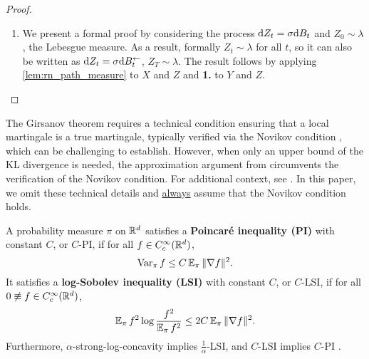 \begin{proof}
\begin{enumerate}[wide=0pt,itemsep=0pt, topsep=0pt,parsep=0pt,partopsep=0pt]
\item We present a formal proof by considering the process $\mathrm{d} Z_t=\sigma\mathrm{d} B_t$ and $Z_0\sim\lambda$, the Lebesgue measure. As a result, formally $Z_t\sim\lambda$ for all $t$, so it can also be written as $\mathrm{d} Z_t=\sigma\mathrm{d}B^\gets_t$, $Z_T\sim\lambda$. The result follows by applying \cref{lem:rn_path_measure} to $X$ and $Z$ and \textbf{1.} to $Y$ and $Z$.
\end{enumerate}
\end{proof}

\begin{remark}
    The Girsanov theorem requires a technical condition ensuring that a local martingale is a true martingale, typically verified via the Novikov condition \cite[Chap. 3, Cor. 5.13]{karatzas1991brownian}, which can be challenging to establish. However, when only an upper bound of the KL divergence is needed, the approximation argument from \citet[App. B.2]{chen2023sampling} circumvents the verification of the Novikov condition. For additional context, see \citet[Sec. 3.2]{chewi2022log}. In this paper, we omit these technical details and \underline{always} assume that the Novikov condition holds.
\end{remark}

\begin{definition}
    A probability measure $\pi$ on $\mathbb{R}^d$ satisfies a \textbf{Poincar\'e inequality (PI)} with constant $C$, or $C$-PI, if for all $f\in C_c^\infty(\mathbb{R}^d)$,
    $$\operatorname{Var}_\pi f\le C\operatorname{\mathbb{E}}_\pi\|\nabla f\|^2.$$
    It satisfies a \textbf{log-Sobolev inequality (LSI)} with constant $C$, or $C$-LSI, if for all $0\not\equiv f\in C_c^\infty(\mathbb{R}^d)$,
    $$\operatorname{\mathbb{E}}_\pi f^2\log\frac{f^2}{\operatorname{\mathbb{E}}_\pi f^2}\le2C\operatorname{\mathbb{E}}_\pi\|\nabla f\|^2.$$
    Furthermore, $\alpha$-strong-log-concavity implies $\frac{1}{\alpha}$-LSI, and $C$-LSI implies $C$-PI \citep{bakry2014analysis}.
    \label{def:iso}
\end{definition}